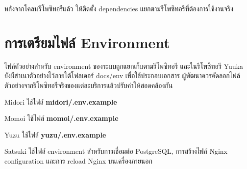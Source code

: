 \begin{figure}[htbp]
\centering
{}
\caption{}
\label{figC:GitClone}
\end{figure}

\hspace*{1.3em}
หลังจากโคลนรีโพซิทอรีแล้ว ให้ติดตั้ง dependencies แยกตามรีโพซิทอรีที่ต้องการใช้งานจริง

\begin{figure}[htbp]
\centering
{}
\caption{}
\label{figC:BunInstall}
\end{figure}

\section{การเตรียมไฟล์ Environment}
\hspace*{1.3em}
ไฟล์ตัวอย่างสำหรับ environment ของระบบถูกแยกเก็บตามรีโพซิทอรี และในรีโพซิทอรี Yuuka ยังมีสำเนาตัวอย่างไว้ภายใต้โฟลเดอร์ docs/env เพื่อใช้ประกอบเอกสาร ผู้พัฒนาควรคัดลอกไฟล์ตัวอย่างจากรีโพซิทอรีจริงของแต่ละบริการแล้วปรับค่าให้สอดคล้องกัน

\begin{mycustomenum2}
    \item Midori ใช้ไฟล์ \textbf{midori/.env.example}
    \item Momoi ใช้ไฟล์ \textbf{momoi/.env.example}
    \item Yuzu ใช้ไฟล์ \textbf{yuzu/.env.example}
    \item Satsuki ใช้ไฟล์ environment สำหรับการเชื่อมต่อ PostgreSQL, การสร้างไฟล์ Nginx configuration และการ reload Nginx บนเครื่องภายนอก
\end{mycustomenum2}

